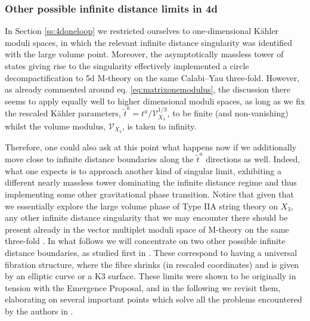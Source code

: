 \subsubsection{Other possible infinite distance limits in 4d}
\label{ss:generalizations}	

In Section \ref{ss:4doneloop} we restricted ourselves to one-dimensional K\"ahler moduli spaces, in which the relevant infinite distance singularity was identified with the large volume point. Moreover, the asymptotically massless tower of states giving rise to the singularity effectively implemented a circle decompactification to 5d M-theory on the same Calabi--Yau three-fold. However, as already commented around eq. \eqref{eq:matrixonemodulus}, the discussion there seems to apply equally well to higher dimensional moduli spaces, as long as we fix the rescaled K\"ahler parameters, $\tilde{t}^a = t^a/\mathcal{V}_{X_3}^{1/3}$, to be finite (and non-vanishing) whilst the volume modulus, $\mathcal{V}_{X_3}$, is taken to infinity.
		
Therefore, one could also ask at this point what happens now if we additionally move close to infinite distance boundaries along the $\tilde{t}^a$ directions as well. Indeed, what one expects is to approach another kind of singular limit, exhibiting a different nearly massless tower dominating the infinite distance regime and thus implementing some other gravitational phase transition. Notice that given that we essentially explore the large volume phase of Type IIA string theory on $X_3$, any other infinite distance singularity that we may encounter there should be present already in the vector multiplet moduli space of M-theory on the same three-fold \cite{Witten:1996qb}. In what follows we will concentrate on two other possible infinite distance boundaries, as studied first in \cite{Lee:2019wij, Corvilain:2018lgw}. These correspond to having a universal fibration structure, where the fibre shrinks (in rescaled coordinates) and is given by an elliptic curve or a K3 surface. These limits were shown to be originally in tension with the Emergence Proposal, and in the following we revisit them, elaborating on several important points which solve all the problems encountered by the authors in \cite{Grimm:2018ohb}.
		
